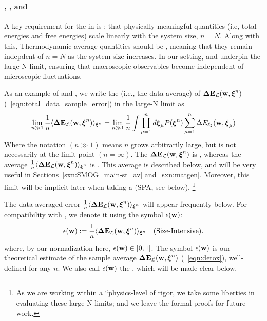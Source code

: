 \paragraph{\SizeExtensivity, \SizeIntensivity, and \SizeConsistency}
A key requirement for the \ThermodynamicLimit in \STATMECH is \emph{\SizeExtensivity}:
that physically meaningful quantities (i.e, total energies and free energies)
scale linearly with the system size, $n=N$.
Along with this, Thermodynamic average quantities should be \emph{\SizeIntensive},
meaning that they remain indepdent of $n=N$ as the system size increases.
In our setting, \SizeExtensivity and \SizeIntensivity underpin the large-N limit,
ensuring that macroscopic observables become independent of
microscopic fluctuations.

As an example of \SizeExtensivity and \SizeIntensivity, 
we write the \ExpectedValue (i.e., the data-average) of \TotalDataSampleError $\mathbf{\Delta {E}}_{\mathcal{L}}(\mathbf{w}, \boldsymbol{\xi}^{n})$ (\EQN~\ref{eqn:total_data_sample_error})
in the large-N limit as
\begin{align}
  \lim_{n\gg 1}  \frac{1}{n}\langle\mathbf{\Delta {E}}_{\mathcal{L}}(\mathbf{w}, \boldsymbol{\xi}^{n})\rangle_{\boldsymbol{\xi}^{n}}=
  \lim_{n\gg 1}\frac{1}{n}
\int \prod_{\mu=1}^{n}d\boldsymbol{\xi}_{\mu}P(\boldsymbol{\xi}^{n})
  \sum_{\mu=1}^{n}\Delta E_{\ell_2}({\mathbf{w}},\boldsymbol{\xi}_{\mu})
\end{align}
Where the notation $(n \gg 1)$ means $n$ grows arbitrarily large, but is not necessarily
at the limit point $(n=\infty)$.
The \TotalDataSampleError $\mathbf{\Delta {E}}_{\mathcal{L}}(\mathbf{w}, \boldsymbol{\xi}^{n})$ is \SizeExtensive, whereas the
average $\frac{1}{n}\langle\mathbf{\Delta {E}}_{\mathcal{L}}(\mathbf{w}, \boldsymbol{\xi}^{n})\rangle_{\boldsymbol{\xi}^{n}}$ is \SizeIntensive.
This average is described below, and will be very useful in Sections~\ref{sxn:SMOG_main-st_av}
and~\ref{sxn:matgen}.
Moreover, this limit will be implicit later when taking a \SaddlePointApproximation (SPA, see below).
\footnote{As we are working within a ``physics-level of rigor, we take some liberties in evaluating these large-N limits; and we leave the formal proofs for future work.  }

The data-averaged error  $\tfrac{1}{n}\langle \mathbf{\Delta {E}}_{\mathcal{L}}(\mathbf{w}, \boldsymbol{\xi}^{n}) \rangle_{\boldsymbol{\xi}^{n}}$ will appear frequently below.
For compatibility with \cite{SST92}, we denote it using the symbol $\epsilon({\mathbf{w}})$:
\begin{align}
 \label{eqn:epsl}
 \epsilon({\mathbf{w}}):=\frac{1}{n}\langle \mathbf{\Delta {E}}_{\mathcal{L}}(\mathbf{w}, \boldsymbol{\xi}^{n}) \rangle_{\boldsymbol{\xi}^{n}} \quad \text{(Size-Intensive)}.
\end{align}
where, by our normalization here, $\epsilon({\mathbf{w}}) \in [0,1]$.
The symbol $\epsilon({\mathbf{w}})$ is our theoretical estimate of the sample average $\mathbf{\Delta {E}}_{\mathcal{L}}(\mathbf{w}, \boldsymbol{\xi}^{n})$ (\EQN~\ref{eqn:detox}),
well-defined for any $n$.
We also call $\epsilon({\mathbf{w}})$ the \emph{\EffectivePotential}, which will be made clear below.

